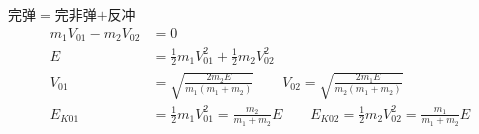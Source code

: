 完弹$=$完非弹$+$反冲
\begin{align*}
m_1V_{01}-m_2V_{02}&=0 \\ %
E&=\tfrac12m_1V_{01}^2+\tfrac12m_2V_{02}^2\\
V_{01}&=\sqrt{\frac{2m_2E}{m_1(m_1+m_2)}}\qquad V_{02}=\sqrt{\frac{2m_1E}{m_2(m_1+m_2)}}\\
E_{K01}&=\tfrac12m_1V_{01}^2=\frac{m_2}{m_1+m_2}E\qquad E_{K02}=\tfrac12m_2V_{02}^2=\frac{m_1}{m_1+m_2}E %
\end{align*}
